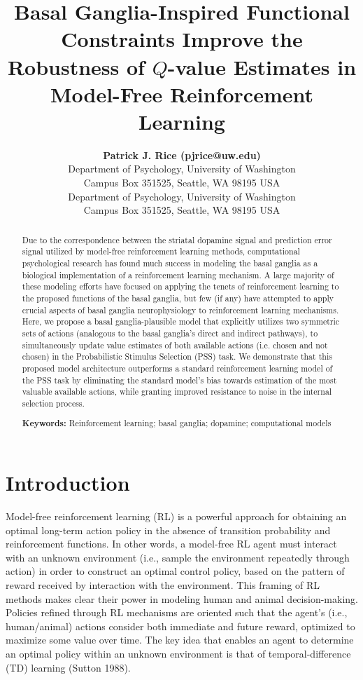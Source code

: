 \documentclass[10pt,letterpaper]{article}
\title{Basal Ganglia-Inspired Functional Constraints Improve the Robustness of $Q$-value Estimates in Model-Free Reinforcement Learning}
\author{{\large \bf Patrick J. Rice (pjrice@uw.edu)} \\
  Department of Psychology, University of Washington \\
  Campus Box 351525, Seattle, WA 98195 USA
  \AND {\large \bf Andrea Stocco (stocco@uw.edu)} \\
  Department of Psychology, University of Washington \\
  Campus Box 351525, Seattle, WA 98195 USA}
\begin{document}
\maketitle


\begin{abstract}
Due to the correspondence between the striatal dopamine signal and prediction error signal utilized by model-free reinforcement learning methods, computational psychological research has found much success in modeling the basal ganglia as a biological implementation of a reinforcement learning mechanism. A large majority of these modeling efforts have focused on applying the tenets of reinforcement learning to the proposed functions of the basal ganglia, but few (if any) have attempted to apply crucial aspects of basal ganglia neurophysiology to reinforcement learning mechanisms. Here, we propose a basal ganglia-plausible model that explicitly utilizes two symmetric sets of actions (analogous to the basal ganglia’s direct and indirect pathways), to simultaneously update value estimates of both available actions (i.e. chosen and not chosen) in the Probabilistic Stimulus Selection (PSS) task. We demonstrate that this proposed model architecture outperforms a standard reinforcement learning model of the PSS task by eliminating the standard model's bias towards estimation of the most valuable available actions, while granting improved resistance to noise in the internal selection process.

\textbf{Keywords:} 
Reinforcement learning; basal ganglia; dopamine; computational models
\end{abstract}


\section{Introduction}


Model-free reinforcement learning (RL) is a powerful approach for obtaining an optimal long-term action policy in the absence of transition probability and reinforcement functions. In other words, a model-free RL agent must interact with an unknown environment (i.e., sample the environment repeatedly through action) in order to construct an optimal control policy, based on the pattern of reward received by interaction with the environment. This framing of RL methods makes clear their power in modeling human and animal decision-making. Policies refined through RL mechanisms are oriented such that the agent's (i.e., human/animal) actions consider both immediate and future reward, optimized to maximize some value over time. The key idea that enables an agent to determine an optimal policy within an unknown environment is that of temporal-difference (TD) learning (Sutton 1988). 
\end{document}
